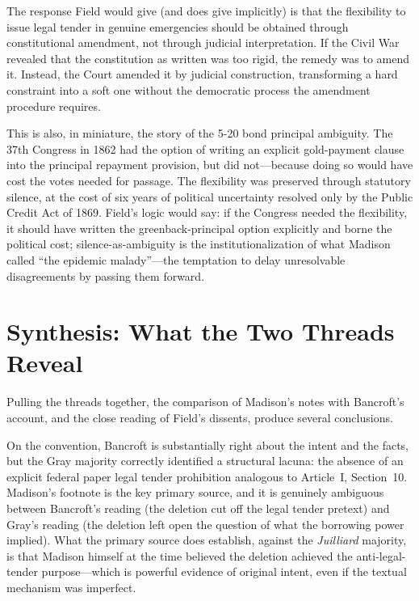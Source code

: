 \documentclass[12pt]{article}
\begin{document}
The response Field would give (and does give implicitly) is that the
flexibility to issue legal tender in genuine emergencies should be
obtained through constitutional amendment, not through judicial
interpretation. If the Civil War revealed that the constitution as
written was too rigid, the remedy was to amend it. Instead, the
Court amended it by judicial construction, transforming a hard
constraint into a soft one without the democratic process the
amendment procedure requires.

This is also, in miniature, the story of the 5-20 bond principal
ambiguity. The 37th Congress in 1862 had the option of writing an
explicit gold-payment clause into the principal repayment provision,
but did not---because doing so would have cost the votes needed for
passage. The flexibility was preserved through statutory silence,
at the cost of six years of political uncertainty resolved only
by the Public Credit Act of 1869. Field's logic would say: if
the Congress needed the flexibility, it should have written the
greenback-principal option explicitly and borne the political cost;
silence-as-ambiguity is the institutionalization of what Madison
called ``the epidemic malady''---the temptation to delay unresolvable
disagreements by passing them forward.

\section{Synthesis: What the Two Threads Reveal}

Pulling the threads together, the comparison of Madison's notes with
Bancroft's account, and the close reading of Field's dissents, produce
several conclusions.

On the convention, Bancroft is substantially right about the intent
and the facts, but the Gray majority correctly identified a structural
lacuna: the absence of an explicit federal paper legal tender prohibition
analogous to Article~I, Section~10. Madison's footnote is the key
primary source, and it is genuinely ambiguous between Bancroft's
reading (the deletion cut off the legal tender pretext) and Gray's
reading (the deletion left open the question of what the borrowing
power implied). What the primary source does establish, against the
\textit{Juilliard} majority, is that Madison himself at the time
believed the deletion achieved the anti-legal-tender purpose---which
is powerful evidence of original intent, even if the textual
mechanism was imperfect.
\end{document}
